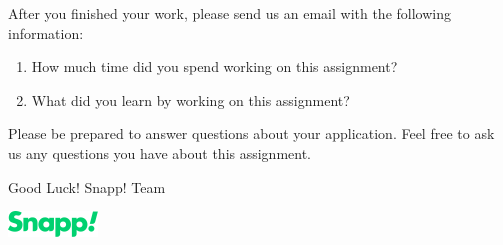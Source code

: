 \documentclass{article}
\begin{document}
After you finished your work, please send us an email with the following information:

\begin{enumerate}
  \item How much time did you spend working on this assignment?
  \item What did you learn by working on this assignment?
\end{enumerate}

Please be prepared to answer questions about your application. Feel free to ask us any questions you have about this assignment.

Good Luck!
Snapp! Team

\vspace{1cm}
\includegraphics[width=.25\textwidth]{./snapp.png}
\end{document}
